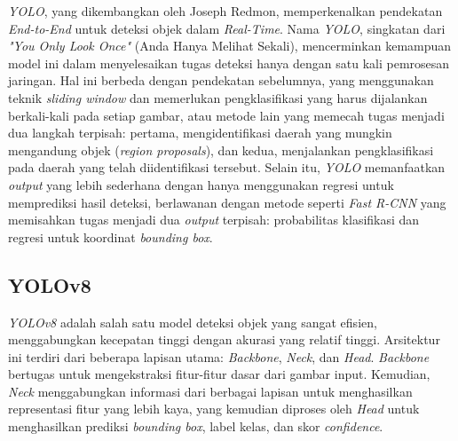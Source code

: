\emph{YOLO}, yang dikembangkan oleh Joseph Redmon, memperkenalkan pendekatan \emph{End-to-End} untuk deteksi objek dalam \emph{Real-Time}. Nama \emph{YOLO}, singkatan dari \emph{"You Only Look Once"} (Anda Hanya Melihat Sekali), mencerminkan kemampuan model ini dalam menyelesaikan tugas deteksi hanya dengan satu kali pemrosesan jaringan. Hal ini berbeda dengan pendekatan sebelumnya, yang menggunakan teknik \emph{sliding window} dan memerlukan pengklasifikasi yang harus dijalankan berkali-kali pada setiap gambar, atau metode lain yang memecah tugas menjadi dua langkah terpisah: pertama, mengidentifikasi daerah yang mungkin mengandung objek (\emph{region proposals}), dan kedua, menjalankan pengklasifikasi pada daerah yang telah diidentifikasi tersebut. Selain itu, \emph{YOLO} memanfaatkan \emph{output} yang lebih sederhana dengan hanya menggunakan regresi untuk memprediksi hasil deteksi, berlawanan dengan metode seperti \emph{Fast R-CNN} yang memisahkan tugas menjadi dua \emph{output} terpisah: probabilitas klasifikasi dan regresi untuk koordinat \emph{bounding box}.

\subsection{YOLOv8}
\label{subsec:YOLOv8}

\emph{YOLOv8} adalah salah satu model deteksi objek yang sangat efisien, menggabungkan kecepatan tinggi dengan akurasi yang relatif tinggi. Arsitektur ini terdiri dari beberapa lapisan utama: \emph{Backbone}, \emph{Neck}, dan \emph{Head}. \emph{Backbone} bertugas untuk mengekstraksi fitur-fitur dasar dari gambar input. Kemudian, \emph{Neck} menggabungkan informasi dari berbagai lapisan untuk menghasilkan representasi fitur yang lebih kaya, yang kemudian diproses oleh \emph{Head} untuk menghasilkan prediksi \emph{bounding box}, label kelas, dan skor \emph{confidence}.

